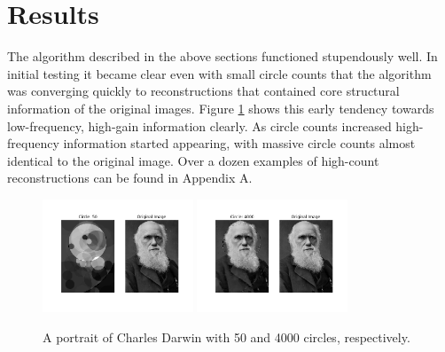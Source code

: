 \documentclass[12pt]{article}
\begin{document}
\section*{Results}
The algorithm described in the above sections functioned stupendously well. In initial testing it became clear even with small circle counts that the algorithm was converging quickly to reconstructions that contained core structural information of the original images. Figure \ref{fig:darwin_0050} shows this early tendency towards low-frequency, high-gain information clearly. As circle counts increased high-frequency information started appearing, with massive circle counts almost identical to the original image. Over a dozen examples of high-count reconstructions can be found in Appendix A. 
\begin{figure}[H]
\centering
\noindent\includegraphics[width=0.4\textwidth]{../results/darwin/darwin_0050}
\noindent\includegraphics[width=0.4\textwidth]{../results/darwin/darwin_4000}
\caption{A portrait of Charles Darwin with 50 and 4000 circles, respectively. }
\label{fig:darwin_0050}
\end{figure}
\end{document}
